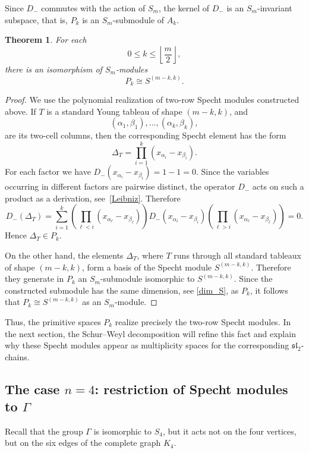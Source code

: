 \documentclass[12pt,reqno]{amsart}
\newtheorem{theorem}{Theorem}[section]
\begin{document}
Since $D_-$ commutes with the action of $S_m$, the kernel of $D_-$ is an
$S_m$-invariant subspace, that is, $P_k$ is an $S_m$-submodule of $A_k$.

\begin{theorem}
For each
$$
0\le k\le \left\lfloor\frac m2\right\rfloor,
$$
there is an isomorphism of $S_m$-modules
$$
P_k\cong S^{(m-k,k)}.
$$
\end{theorem}

\begin{proof}
We use the polynomial realization of two-row Specht modules constructed
above.
If $T$ is a standard Young tableau of shape $(m-k,k)$, and
$$
(\alpha_1,\beta_1),\dots,(\alpha_k,\beta_k),
$$
are its two-cell columns, then the corresponding Specht element has the form
$$
\Delta_T=\prod_{i=1}^{k}(x_{\alpha_i}-x_{\beta_i}).
$$
For each factor we have
$
D_-(x_{\alpha_i}-x_{\beta_i})=1-1=0.
$
Since the variables occurring in different factors are pairwise distinct, the
operator $D_-$ acts on such a product as a derivation, see~\eqref{Leibniz}.
Therefore
$$
D_-(\Delta_T)
=
\sum_{i=1}^{k}
\left(\prod_{\ell<i}(x_{\alpha_\ell}-x_{\beta_\ell})\right)
D_-(x_{\alpha_i}-x_{\beta_i})
\left(\prod_{\ell>i}(x_{\alpha_\ell}-x_{\beta_\ell})\right)
=0.
$$
Hence
$
\Delta_T\in P_k.
$

On the other hand, the elements $\Delta_T$, where $T$ runs through all
standard tableaux of shape $(m-k,k)$, form a basis of the Specht module
$S^{(m-k,k)}$. Therefore they generate in $P_k$ an $S_m$-submodule
isomorphic to $S^{(m-k,k)}$.
Since the constructed submodule has the same dimension, see \eqref{dim_S},
as $P_k$, it follows that
$
P_k\cong S^{(m-k,k)}
$
as an $S_m$-module.
\end{proof}

Thus, the primitive spaces $P_k$ realize precisely the two-row Specht modules.
In the next section, the Schur--Weyl decomposition will refine this fact and
explain why these Specht modules appear as multiplicity spaces for the
corresponding $\mathfrak{sl}_2$-chains.




\subsection{The case $n=4$: restriction of Specht modules to 
$\Gamma$}


Recall that the group $\Gamma$ is isomorphic to $S_4$, but it acts not on the
four vertices, but on the six edges of the complete graph $K_4$.
\end{document}

